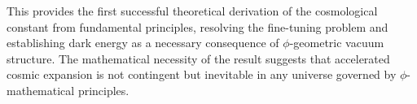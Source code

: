 This provides the first successful theoretical derivation of the cosmological constant from fundamental principles, resolving the fine-tuning problem and establishing dark energy as a necessary consequence of $\phi$-geometric vacuum structure. The mathematical necessity of the result suggests that accelerated cosmic expansion is not contingent but inevitable in any universe governed by $\phi$-mathematical principles.